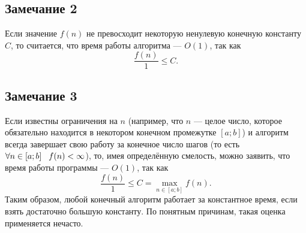 \subsection*{Замечание 2}
Если значение $f(n)$ не превосходит некоторую ненулевую конечную константу $C$, то считается, что время работы алгоритма --- $O(1)$, так как
$$\frac{f(n)}{1} \le C.$$
\newpage
\subsection*{Замечание 3}
Если известны ограничения на $n$ (например, что $n$ --- целое число, которое обязательно находится в некотором конечном промежутке $[a; b]$) и алгоритм всегда завершает свою работу за конечное число шагов (то есть $\forall n \in [a; b] \hspace{3mm} f(n) < \infty$), то, имея определённую смелость, можно заявить, что время работы программы --- $O(1)$, так как
$$\frac{f(n)}{1} \le C = \max_{n \in [a; b]}{f(n)}.$$
Таким образом, любой конечный алгоритм работает за константное время, если взять достаточно большую константу. По понятным причинам, такая оценка применяется нечасто.
